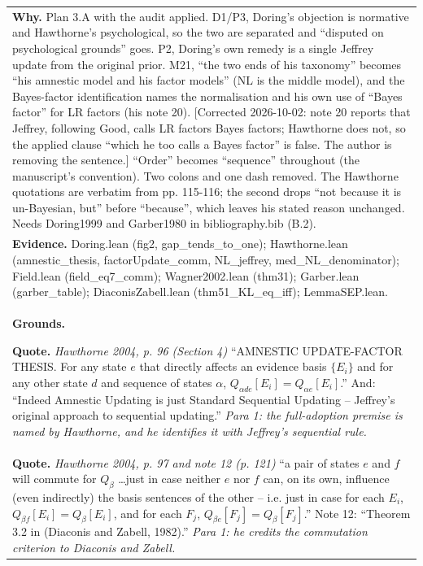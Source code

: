 \documentclass[10pt]{article}
\theoremstyle{definition}
\newlength{\fullw}\setlength{\fullw}{25.9cm}
\begin{document}
{\begin{longtable}{|p{0.9cm}|p{12.2cm}|p{12.2cm}|}
\multicolumn{3}{|p{\fullw}|}{\textbf{Why.} Plan 3.A with the audit applied. D1/P3, Doring's objection is normative and Hawthorne's psychological, so the two are separated and ``disputed on psychological grounds'' goes. P2, Doring's own remedy is a single Jeffrey update from the original prior. M21, ``the two ends of his taxonomy'' becomes ``his amnestic model and his factor models'' (NL is the middle model), and the Bayes-factor identification names the normalisation and his own use of ``Bayes factor'' for LR factors (his note 20). [Corrected 2026-10-02: note 20 reports that Jeffrey, following Good, calls LR factors Bayes factors; Hawthorne does not, so the applied clause ``which he too calls a Bayes factor'' is false. The author is removing the sentence.] ``Order'' becomes ``sequence'' throughout (the manuscript's convention). Two colons and one dash removed. The Hawthorne quotations are verbatim from pp. 115-116; the second drops ``not because it is un-Bayesian, but'' before ``because'', which leaves his stated reason unchanged. Needs Doring1999 and Garber1980 in bibliography.bib (B.2).} \\
\multicolumn{3}{|p{\fullw}|}{\textbf{Evidence.} Doring.lean (fig2, gap\_tends\_to\_one); Hawthorne.lean (amnestic\_thesis, factorUpdate\_comm, NL\_jeffrey, med\_NL\_denominator); Field.lean (field\_eq7\_comm); Wagner2002.lean (thm31); Garber.lean (garber\_table); DiaconisZabell.lean (thm51\_KL\_eq\_iff); LemmaSEP.lean.} \\ \hline
\multicolumn{3}{|p{\fullw}|}{\textbf{Grounds.}\par \textbf{Quote.} \textit{Hawthorne 2004, p. 96 (Section 4)} \newline ``AMNESTIC UPDATE-FACTOR THESIS. For any state $e$ that directly affects an evidence basis $\{E_i\}$ and for any other state $d$ and sequence of states $\alpha$, $Q_{\alpha de}[E_i] = Q_{\alpha e}[E_i]$.'' And: ``Indeed Amnestic Updating is just Standard Sequential Updating -- Jeffrey's original approach to sequential updating.'' \newline \textit{Para 1: the full-adoption premise is named by Hawthorne, and he identifies it with Jeffrey's sequential rule.}} \\
\multicolumn{3}{|p{\fullw}|}{\textbf{Quote.} \textit{Hawthorne 2004, p. 97 and note 12 (p. 121)} \newline ``a pair of states $e$ and $f$ will commute for $Q_\beta$ \ldots just in case neither $e$ nor $f$ can, on its own, influence (even indirectly) the basis sentences of the other -- i.e. just in case for each $E_i$, $Q_{\beta f}[E_i] = Q_\beta[E_i]$, and for each $F_j$, $Q_{\beta e}[F_j] = Q_\beta[F_j]$.'' Note 12: ``Theorem 3.2 in (Diaconis and Zabell, 1982).'' \newline \textit{Para 1: he credits the commutation criterion to Diaconis and Zabell.}} \\

\end{longtable}}
\end{document}
